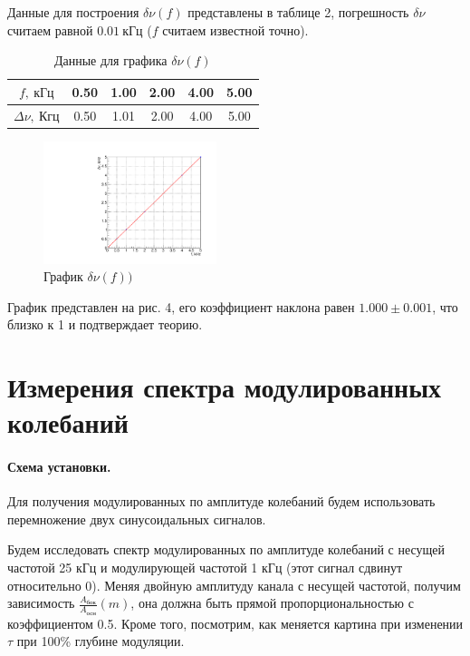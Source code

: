 \documentclass[12pt,a4paper]{article}
\begin{document}
Данные для построения $\delta\nu(f)$ представлены в таблице 2, погрешность $\delta\nu$ считаем равной $0.01~\text{кГц}$ ($f$ считаем известной точно).

\begin{table}\centering
\begin{tabular}[ht]{|*{6}{c|}}
\hline
$f,~\text{кГц}$&0.50&1.00&2.00&4.00&5.00\\
\hline
$\Delta \nu,~ Кгц$&0.50&1.01&2.00&4.00&5.00\\
\hline
\end{tabular}
\caption{Данные для графика $\delta\nu(f)$}
\end{table}
\begin{figure}
\centering\includegraphics[width = 0.45\textwidth]{Plot4}
\captionsetup{justification = centering}
\caption{График $\delta\nu(f))$ \label{Plot4}}
\vspace{-60pt}
\end{figure}
График представлен на рис. 4, его коэффициент наклона равен $1.000\pm0.001$, что близко к 1 и подтверждает теорию.
\section{Измерения спектра модулированных колебаний}
\paragraph{Схема установки.} Для получения модулированных по амплитуде колебаний будем использовать перемножение двух синусоидальных сигналов.

Будем исследовать спектр модулированных по амплитуде колебаний с несущей частотой 25 кГц и модулирующей частотой 1 кГц (этот сигнал сдвинут относительно 0). Меняя двойную амплитуду канала с несущей частотой, получим зависимость $\frac{A_\text{бок}}{A_\text{осн}}(m)$, она должна быть прямой пропорциональностью с коэффициентом 0.5. Кроме того, посмотрим, как меняется картина при изменении $\tau$ при 100\% глубине модуляции.
\end{document}
